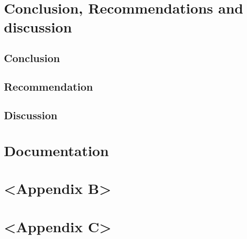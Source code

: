\documentclass[12pt]{scrreprt}
\begin{document}
%

\chapter{Conclusion, Recommendations and discussion}
\section{Conclusion}
\section{Recommendation}



\section{Discussion}

\begin{appendices}
\chapter{Documentation}
\chapter{<Appendix B>}
\chapter{<Appendix C>}
\end{appendices}
\end{document}
